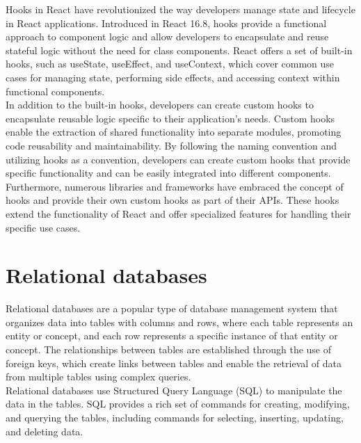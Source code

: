 Hooks in React have revolutionized the way developers manage state and lifecycle in React applications. Introduced in React 16.8, hooks provide a functional approach to component logic and allow developers to encapsulate and reuse stateful logic without the need for class components. React offers a set of built-in hooks, such as useState, useEffect, and useContext, which cover common use cases for managing state, performing side effects, and accessing context within functional components. \cite{React_hooks_offical} \\

\noindent
In addition to the built-in hooks, developers can create custom hooks to encapsulate reusable logic specific to their application's needs. Custom hooks enable the extraction of shared functionality into separate modules, promoting code reusability and maintainability. By following the naming convention and utilizing hooks as a convention, developers can create custom hooks that provide specific functionality and can be easily integrated into different components. \cite{React_CustomHooks_offical} \\

\noindent
Furthermore, numerous libraries and frameworks have embraced the concept of hooks and provide their own custom hooks as part of their APIs. These hooks extend the functionality of React and offer specialized features for handling their specific use cases. \\

\section{Relational databases}
\label{sec:relational-databases}

Relational databases are a popular type of database management system that organizes data into tables with columns and rows, where each table represents an entity or concept, and each row represents a specific instance of that entity or concept. The relationships between tables are established through the use of foreign keys, which create links between tables and enable the retrieval of data from multiple tables using complex queries. \cite{wikipedia_relationalDB} \\

\noindent
Relational databases use Structured Query Language (SQL) to manipulate the data in the tables. SQL provides a rich set of commands for creating, modifying, and querying the tables, including commands for selecting, inserting, updating, and deleting data. \\

